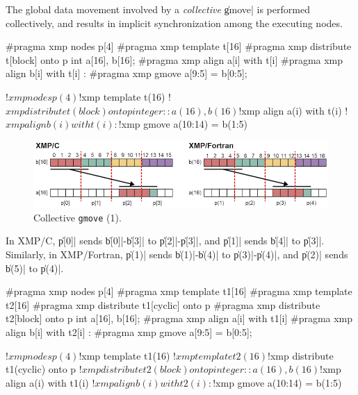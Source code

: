 

The global data movement involved by a {\it collective} \|gmove| is performed
collectively, and results in implicit synchronization among the 
executing nodes.

\begin{XCexample}
#pragma xmp nodes p[4]
#pragma xmp template t[16]
#pragma xmp distribute t[block] onto p
int a[16], b[16];
#pragma xmp align a[i] with t[i]
#pragma xmp align b[i] with t[i]
     :
#pragma xmp gmove
  a[9:5] = b[0:5];
\end{XCexample}

\begin{XFexample}
!$xmp nodes p(4)
!$xmp template t(16)
!$xmp distribute t(block) onto p
integer :: a(16), b(16)
!$xmp align a(i) with t(i)
!$xmp align b(i) with t(i)
     :
!$xmp gmove
  a(10:14) = b(1:5)
\end{XFexample}

\begin{figure}
  \centering
  \includegraphics[width=\textwidth]{figs/gmove.png}
  \caption{Collective {\tt gmove} (1).}
\end{figure}

In XMP/C, \|p[0]| sends \|b[0]|-\|b[3]| to \|p[2]|-\|p[3]|, and \|p[1]|
sends \|b[4]| to \|p[3]|. Similarly, in XMP/Fortran, \|p(1)| sends
\|b(1)|-\|b(4)| to \|p(3)|-\|p(4)|, and \|p(2)| sends \|b(5)| to \|p(4)|.

\begin{XCexample}
#pragma xmp nodes p[4]
#pragma xmp template t1[16]
#pragma xmp template t2[16]
#pragma xmp distribute t1[cyclic] onto p
#pragma xmp distribute t2[block] onto p
int a[16], b[16];
#pragma xmp align a[i] with t1[i]
#pragma xmp align b[i] with t2[i]
     :
#pragma xmp gmove
  a[9:5] = b[0:5];
\end{XCexample}

\begin{XFexample}
!$xmp nodes p(4)
!$xmp template t1(16)
!$xmp template t2(16)
!$xmp distribute t1(cyclic) onto p
!$xmp distribute t2(block) onto p
integer :: a(16), b(16)
!$xmp align a(i) with t1(i)
!$xmp align b(i) with t2(i)
     :
!$xmp gmove
  a(10:14) = b(1:5)
\end{XFexample}

